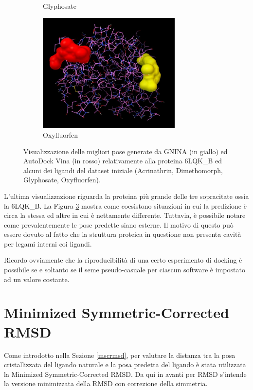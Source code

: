 \begin{figure}[H]
\begin{subfigure}[b]{0.475\textwidth}
        \caption[]%
        {{\small Glyphosate}}    
        \label{fig:2h8v_glyphosate}
    \end{subfigure}
    \hfill
    \begin{subfigure}[b]{0.475\textwidth}   
        \centering 
        \includegraphics[width=\textwidth, height=6cm]{images/chapter4/visualization/6lqk_b_oxyfluorfen.jpg}
        \caption[]%
        {{\small Oxyfluorfen}}    
        \label{fig:2h8v_oxyfluorfen}
        \end{subfigure}
    \caption[Conformazioni proteina-ligando per la proteina 6LQK\_B. ]
    {\small Visualizzazione delle migliori pose generate da GNINA (in giallo) ed AutoDock Vina (in rosso) relativamente alla proteina 6LQK\_B ed alcuni dei ligandi del dataset iniziale (Acrinathrin, Dimethomorph, Glyphosate, Oxyfluorfen).} 
    \label{fig:6lqk_b}
\end{figure}

L'ultima visualizzazione riguarda la proteina più grande delle tre sopracitate ossia la 6LQK\_B. La Figura \ref{fig:6lqk_b} mostra come coesistono situazioni in cui la predizione è circa la stessa ed altre in cui è nettamente differente.
Tuttavia, è possibile notare come prevalentemente le pose predette siano esterne. Il motivo di questo può essere dovuto al fatto che la struttura proteica in questione non presenta cavità per legami interni coi ligandi.


Ricordo ovviamente che la riproducibilità di una certo esperimento di docking è possibile se e soltanto se il seme pseudo-casuale per ciascun software è impostato ad un valore costante. 
\section{Minimized Symmetric-Corrected RMSD}
Come introdotto nella Sezione \ref{mscrmsd}, per valutare la distanza tra la posa cristallizzata del ligando naturale e la posa predetta del ligando è stata utilizzata la Minimized Symmetric-Corrected RMSD.
Da qui in avanti per RMSD s'intende la versione minimizzata della RMSD con correzione della simmetria.

